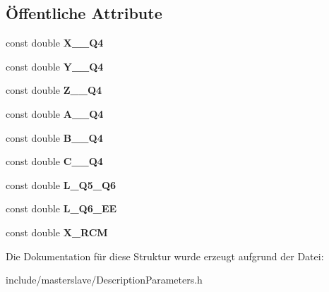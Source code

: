 \subsection*{Öffentliche Attribute}
\begin{DoxyCompactItemize}
\item 
\hypertarget{structtoolDescriptionParameters_a4e70eb885c9964a7d55947d2ebbc3941}{const double {\bfseries X\-\_\-\_\-\-Q4}}\label{structtoolDescriptionParameters_a4e70eb885c9964a7d55947d2ebbc3941}

\item 
\hypertarget{structtoolDescriptionParameters_adb06f493573dbf08ae240d284160489b}{const double {\bfseries Y\-\_\-\_\-\-Q4}}\label{structtoolDescriptionParameters_adb06f493573dbf08ae240d284160489b}

\item 
\hypertarget{structtoolDescriptionParameters_a2cf3044922cd2f75a3e02ad368908303}{const double {\bfseries Z\-\_\-\_\-\-Q4}}\label{structtoolDescriptionParameters_a2cf3044922cd2f75a3e02ad368908303}

\item 
\hypertarget{structtoolDescriptionParameters_ab9694a03b68a2990c09544f8a332de0f}{const double {\bfseries A\-\_\-\_\-\-Q4}}\label{structtoolDescriptionParameters_ab9694a03b68a2990c09544f8a332de0f}

\item 
\hypertarget{structtoolDescriptionParameters_a41be8e1344eb6f6fb6e4b2f3b8ac37cf}{const double {\bfseries B\-\_\-\_\-\-Q4}}\label{structtoolDescriptionParameters_a41be8e1344eb6f6fb6e4b2f3b8ac37cf}

\item 
\hypertarget{structtoolDescriptionParameters_a2c30a06e314ce5ce2114d289569de757}{const double {\bfseries C\-\_\-\_\-\-Q4}}\label{structtoolDescriptionParameters_a2c30a06e314ce5ce2114d289569de757}

\item 
\hypertarget{structtoolDescriptionParameters_a5fd9068ba1c97b74e4a25a002692729c}{const double {\bfseries L\-\_\-\-Q5\-\_\-\-Q6}}\label{structtoolDescriptionParameters_a5fd9068ba1c97b74e4a25a002692729c}

\item 
\hypertarget{structtoolDescriptionParameters_af7dd8266d4683dc4059736564b90fba3}{const double {\bfseries L\-\_\-\-Q6\-\_\-\-E\-E}}\label{structtoolDescriptionParameters_af7dd8266d4683dc4059736564b90fba3}

\item 
\hypertarget{structtoolDescriptionParameters_a79bb942eba1d071ff6adb0b2875d49e2}{const double {\bfseries X\-\_\-\-R\-C\-M}}\label{structtoolDescriptionParameters_a79bb942eba1d071ff6adb0b2875d49e2}

\end{DoxyCompactItemize}


Die Dokumentation für diese Struktur wurde erzeugt aufgrund der Datei\-:\begin{DoxyCompactItemize}
\item 
include/masterslave/Description\-Parameters.\-h\end{DoxyCompactItemize}
